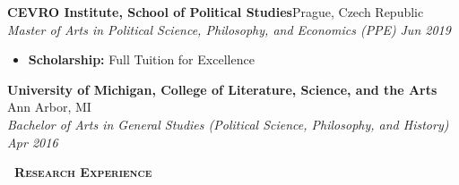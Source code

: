 \documentclass[a4paper,11pt]{article}
\newcommand{\header} [1] {
    \vspace{0.5mm}
    {\textsc{\textbf{\Large{\xrfill[0.5ex]{0.5pt}~#1~\xrfill[0.5ex]{0.5pt}}}}} %
}
\begin{document}
\textbf{CEVRO Institute, School of Political Studies}\hfill Prague, Czech Republic\\
\textit{Master of Arts in Political Science, Philosophy, and Economics (PPE)} \hfill  \textit{Jun 2019}\\
\begin{itemize}
    \item \textbf{Scholarship:} Full Tuition for Excellence
\end{itemize}
\vspace{0.5mm}

\textbf{University of Michigan, College of Literature, Science, and the Arts} \hfill Ann Arbor, MI\\
\textit{Bachelor of Arts in General Studies (Political Science, Philosophy, and History)} \hfill  \textit{Apr 2016}\\

\vspace{0.5mm}

\header{Research Experience} \\
\vspace{0.5mm}


\end{document}
